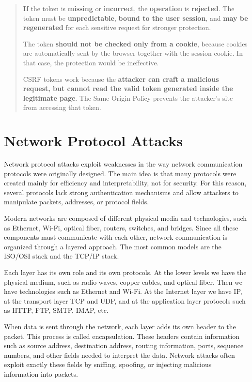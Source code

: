 \documentclass{article}
\begin{document}
\begin{quote}
\textbf{If} the token is \textbf{missing} or \textbf{incorrect}, the \textbf{operation} is \textbf{rejected}. The token must be \textbf{unpredictable}, \textbf{bound to the user session}, and \textbf{may be regenerated} for each sensitive request for stronger protection.

The token \textbf{should not be checked only from a cookie}, because cookies are automatically sent by the browser together with the session cookie. In that case, the protection would be ineffective.

CSRF tokens work because the \textbf{attacker can craft a malicious request, but cannot read the valid token generated inside the legitimate page}. The Same-Origin Policy prevents the attacker's site from accessing that token.
\end{quote}

\section{Network Protocol Attacks}

Network protocol attacks exploit weaknesses in the way network communication protocols were originally designed. The main idea is that many protocols were created mainly for efficiency and interpretability, not for security. For this reason, several protocols lack strong authentication mechanisms and allow attackers to manipulate packets, addresses, or protocol fields.

Modern networks are composed of different physical media and technologies, such as Ethernet, Wi-Fi, optical fiber, routers, switches, and bridges. Since all these components must communicate with each other, network communication is organized through a layered approach. The most common models are the ISO/OSI stack and the TCP/IP stack.

Each layer has its own role and its own protocols. At the lower levels we have the physical medium, such as radio waves, copper cables, and optical fiber. Then we have technologies such as Ethernet and Wi-Fi. At the Internet layer we have IP, at the transport layer TCP and UDP, and at the application layer protocols such as HTTP, FTP, SMTP, IMAP, etc.

When data is sent through the network, each layer adds its own header to the packet. This process is called encapsulation. These headers contain information such as source address, destination address, routing information, ports, sequence numbers, and other fields needed to interpret the data. Network attacks often exploit exactly these fields by sniffing, spoofing, or injecting malicious information into packets.
\end{document}
